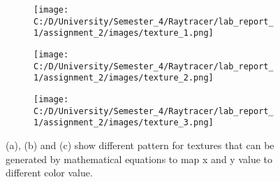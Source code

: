 \documentclass{article}
\begin{document}
	
	\begin{figure}[ht]
		\begin{center}
			\begin{subfigure}{.3\textwidth}
				\centering
				\texttt{[image: C:/D/University/Semester\_4/Raytracer/lab\_report\_1/assignment\_2/images/texture\_1.png]}  
				\caption{}
				\label{fig:sub-first}
			\end{subfigure}
			\begin{subfigure}{.3\textwidth}
				\centering
				\texttt{[image: C:/D/University/Semester\_4/Raytracer/lab\_report\_1/assignment\_2/images/texture\_2.png]}  
				\caption{}
				\label{fig:sub-second}
			\end{subfigure}
			\begin{subfigure}{.3\textwidth}
				\centering
				\texttt{[image: C:/D/University/Semester\_4/Raytracer/lab\_report\_1/assignment\_2/images/texture\_3.png]}  
				\caption{}
				\label{fig:sub-third}
			\end{subfigure}
			
			\caption{(a), (b) and (c) show different pattern for textures that can be generated by mathematical equations to map x and y value to different color value.}
			\label{fig:8}
		\end{center}
	\end{figure}
	
	
\end{document}
